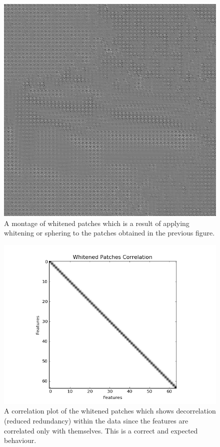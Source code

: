 \documentclass[	DIV=calc,%
				paper=a4,%
				fontsize=11pt,%
				twocolumn]{scrartcl}	 %
\begin{document}
\begin{figure}[H]
    \centering
    \includegraphics[width=0.6\linewidth]{data/sc_data/sc_atwork_whitened_patches_montage.jpg}
    \caption{A montage of whitened patches which is a result of applying whitening or sphering to the patches obtained in the previous figure.}
    \label{sc_atwork_whitened_patches_montage}
\end{figure}
 
 
\begin{figure}[H]
    \centering
    \includegraphics[width=0.7\linewidth]{data/sc_data/sc_atwork_whitened_patches_correlation.png}
    \caption{A correlation plot of the whitened patches which shows decorrelation (reduced redundancy) within the data since the features are correlated only with themselves. This is a correct and expected behaviour.}
    \label{sc_atwork_whitened_patches_correlation}
\end{figure}
\end{document}
